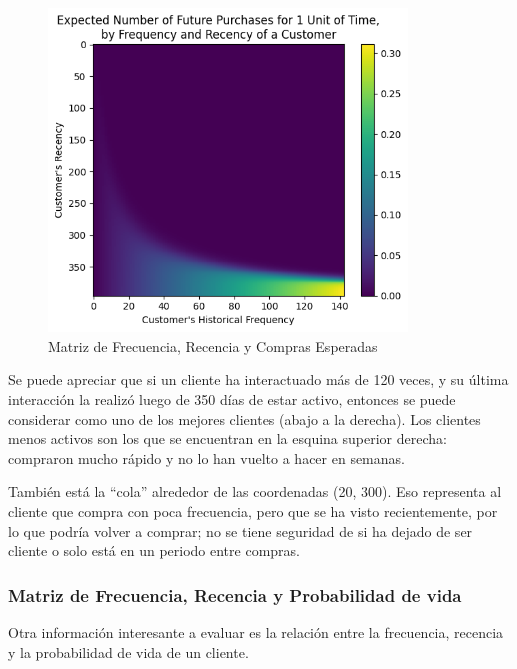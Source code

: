 \begin{figure}[H]
	\centering \includegraphics[width=0.85\textwidth]{images/matriz-f-r.png}
	\caption{Matriz de Frecuencia, Recencia y Compras Esperadas}
	\label{fig:frc}
\end{figure}

\vspace{-5.5mm}

	Se puede apreciar que si un cliente ha interactuado más de 120 veces, y su última interacción la realizó luego de 350 días de estar activo, entonces se puede considerar como uno de los mejores clientes (abajo a la derecha). Los clientes menos activos son los que se encuentran en la esquina superior derecha: compraron mucho rápido y no lo han vuelto a hacer en semanas.

	También está la “cola” alrededor de las coordenadas (20, 300). Eso representa al cliente que compra con poca frecuencia, pero que se ha visto recientemente, por lo que podría volver a comprar; no se tiene seguridad de si ha dejado de ser cliente o solo está en un periodo entre compras.
	
\subsubsection{Matriz de Frecuencia, Recencia y Probabilidad de vida}

Otra información interesante a evaluar es la relación entre la frecuencia, recencia y la probabilidad de vida de un cliente.

